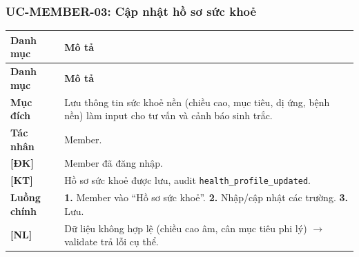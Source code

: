 \subsubsection{UC-MEMBER-03: Cập nhật hồ sơ sức khoẻ}
\begingroup
\renewcommand{\arraystretch}{1.3}
\begin{longtable}{|>{\centering\arraybackslash}m{3cm}|>{\raggedright\arraybackslash}m{12cm}|}
\hline
\textbf{Danh mục} & \textbf{Mô tả} \\ \hline
\endfirsthead
\hline
\textbf{Danh mục} & \textbf{Mô tả} \\ \hline
\endhead
\hline
\endfoot
\textbf{Mục đích} & Lưu thông tin sức khoẻ nền (chiều cao, mục tiêu, dị ứng, bệnh nền) làm input cho tư vấn và cảnh báo sinh trắc. \\
\hline
\textbf{Tác nhân} & Member. \\
\hline
\textbf{[ĐK]} & Member đã đăng nhập. \\
\hline
\textbf{[KT]} & Hồ sơ sức khoẻ được lưu, audit \texttt{health\_profile\_updated}. \\
\hline
\textbf{Luồng chính} & \textbf{1.} Member vào ``Hồ sơ sức khoẻ''. \textbf{2.} Nhập/cập nhật các trường. \textbf{3.} Lưu. \\
\hline
\textbf{[NL]} & Dữ liệu không hợp lệ (chiều cao âm, cân mục tiêu phi lý) $\rightarrow$ validate trả lỗi cụ thể. \\
\hline
\end{longtable}
\endgroup

